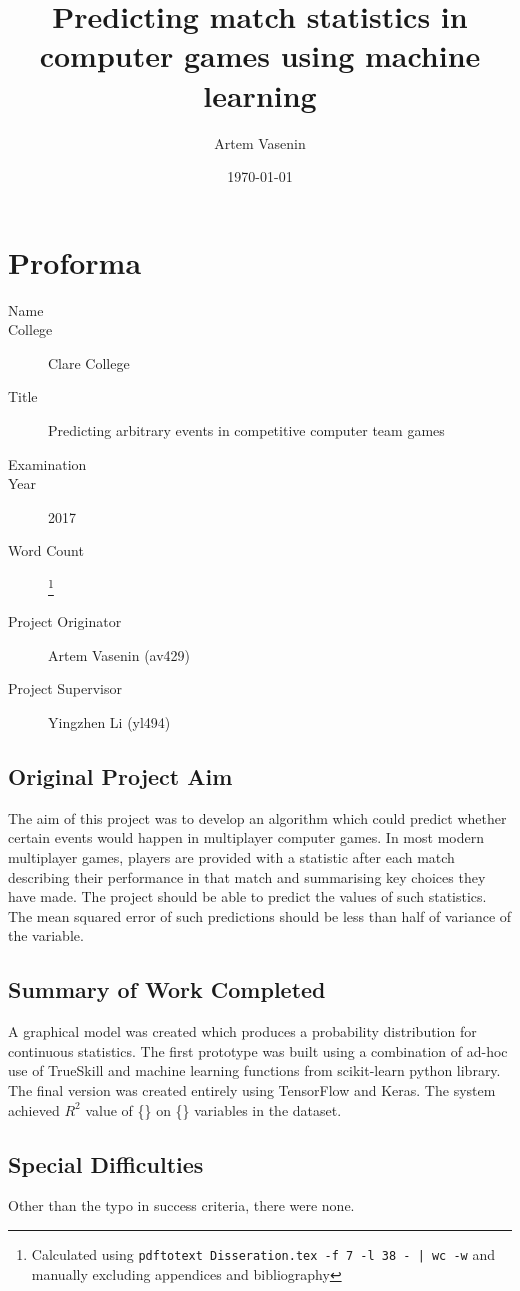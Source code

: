\documentclass[12pt,a4paper]{book}
\title{Predicting match statistics in computer games using machine learning}
\author{Artem Vasenin}
\date{\today}
\newcommand\college{Clare College}
\begin{document}
\frontmatter
\maketitle

\section*{Proforma}
\begin{description}
\item[Name] \theauthor
\item[College] \college
\item[Title] Predicting arbitrary events in competitive computer team games
\item[Examination] %
\item[Year] 2017
\item[Word Count] \footnote{Calculated using \texttt{pdftotext Disseration.tex -f 7 -l 38 - | wc -w} and manually excluding appendices and bibliography} %
\item[Project Originator] Artem Vasenin (av429)
\item[Project Supervisor] Yingzhen Li (yl494)
\end{description}

\subsection*{Original Project Aim}
The aim of this project was to develop an algorithm which could predict whether certain events would happen in multiplayer computer games.
In most modern multiplayer games, players are provided with a statistic after each match describing their performance in that match and summarising key choices they have made.
The project should be able to predict the values of such statistics.
The mean squared error of such predictions should be less than half of variance of the variable.
\subsection*{Summary of Work Completed}
A graphical model was created which produces a probability distribution for continuous statistics.
The first prototype was built using a combination of ad-hoc use of TrueSkill and machine learning functions from scikit-learn python library.
The final version was created entirely using TensorFlow and Keras.
The system achieved $R^2$ value of \{\}
on \{\}
variables in the dataset.
\subsection*{Special Difficulties}
Other than the typo in success criteria, there were none.
\end{document}
